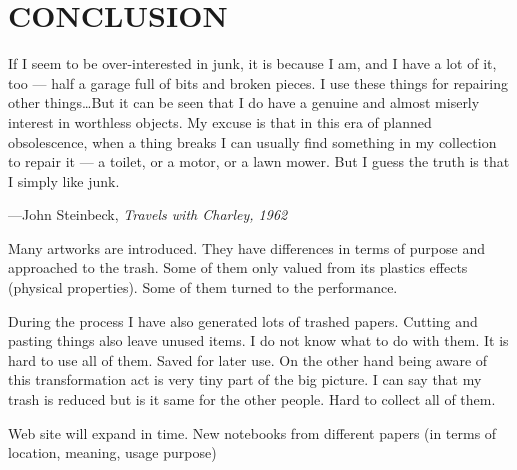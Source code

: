 \chapter{CONCLUSION}




\begin{singlespace}
\epigraph{If I seem to be over-interested in junk, it is because I am, and I have a lot of it, too --- half a garage full of bits and broken pieces. I use these things for repairing other things\ldots But it can be seen that I do have a genuine and almost miserly interest in worthless objects. My excuse is that in this era of planned obsolescence, when a thing breaks I can usually find something in my collection to repair it --- a toilet, or a motor, or a lawn mower. But I guess the truth is that I simply like junk.}{\hfill---John Steinbeck, \textit{Travels with Charley, 1962}}
\end{singlespace}




%
%
Many artworks are introduced. They have differences in terms of purpose and approached to the trash. Some of them only valued from its plastics effects (physical properties). Some of them turned to the performance. 







%
%
 During the process I have also generated lots of trashed papers. Cutting and pasting things also leave unused items. I do not know what to do with them. It is hard to use all of them. Saved for later use. On the other hand being aware of this transformation act is very tiny part of the big picture. I can say that my trash is reduced but is it same for the other people. Hard to collect all of them. 







%
%
 Web site will expand in time. New notebooks from different papers (in terms of location, meaning, usage purpose)




